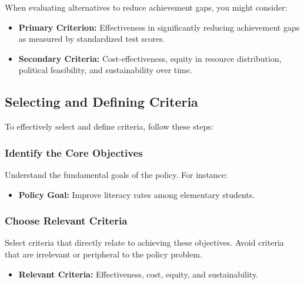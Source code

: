 \documentclass{article}
\theoremstyle{definition}
\theoremstyle{plain}
\begin{document}
\begin{tcolorbox}[colback=gray!5!white, colframe=gray!75!black, title=Example: Criteria for Reducing Achievement Gaps]

When evaluating alternatives to reduce achievement gaps, you might consider:

\begin{itemize}
    \item \textbf{Primary Criterion:} Effectiveness in significantly reducing achievement gaps as measured by standardized test scores.
    
    \item \textbf{Secondary Criteria:} Cost-effectiveness, equity in resource distribution, political feasibility, and sustainability over time.
\end{itemize}
\end{tcolorbox}

\subsection{Selecting and Defining Criteria}

To effectively select and define criteria, follow these steps:

\subsubsection{Identify the Core Objectives}

Understand the fundamental goals of the policy. For instance:

\begin{itemize}
    \item \textbf{Policy Goal:} Improve literacy rates among elementary students.
\end{itemize}

\subsubsection{Choose Relevant Criteria}

Select criteria that directly relate to achieving these objectives. Avoid criteria that are irrelevant or peripheral to the policy problem.

\begin{itemize}
    \item \textbf{Relevant Criteria:} Effectiveness, cost, equity, and sustainability.
\end{itemize}
\end{document}
